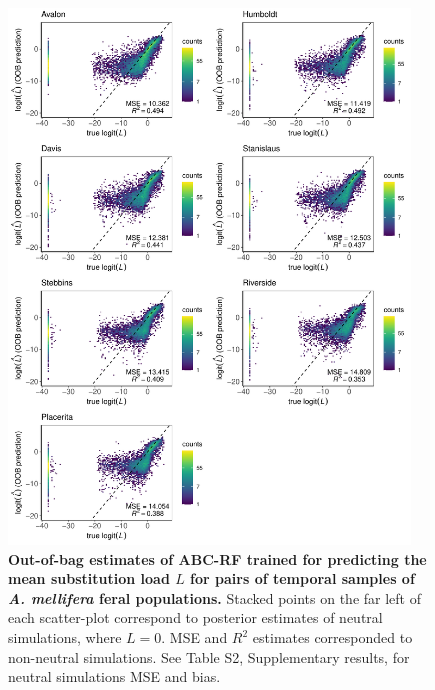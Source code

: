 \documentclass[a4paper, 12pt]{article}
\begin{document}
\begin{figure}[ht]
  \centering
  \includegraphics[width=0.95\textwidth]{Figures/FigureS22_combined_plot_load.pdf}
  \small\caption{\textbf{Out-of-bag estimates of ABC-RF trained for predicting the mean substitution load $L$ for pairs of temporal samples of \textit{A. mellifera} feral populations.} Stacked points on the far left of each scatter-plot correspond to posterior estimates of neutral simulations, where $L = 0$. MSE and $R^2$ estimates corresponded to non-neutral simulations. See Table S2, Supplementary results, for neutral simulations MSE and bias.}
  \label{fig:supple_feralbee_load}
\end{figure}
\end{document}
